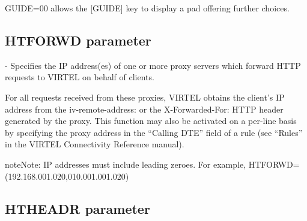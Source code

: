 \documentclass[letterpaper,10pt,english]{sphinxmanual}
\begin{document}
GUIDE=00 allows the {[}GUIDE{]} key to display a pad offering further choices.

\ignorespaces 

\subsection{HTFORWD parameter}
\label{\detokenize{Installation_Guide:htforwd-parameter}}\label{\detokenize{Installation_Guide:index-76}}
\begin{sphinxVerbatim}[commandchars=\\\{\}]
        
\end{sphinxVerbatim}

 - Specifies the IP address(es) of one or more proxy servers which forward HTTP requests to VIRTEL on behalf of clients.

For all requests received from these proxies, VIRTEL obtains the client’s IP address from the iv-remote-address: or the X-Forwarded-For: HTTP header generated by the proxy. This function may also be activated on a per-line basis by specifying the proxy address in the “Calling DTE” field of a rule (see “Rules” in the VIRTEL Connectivity Reference manual).

\begin{sphinxadmonition}{note}{Note:}
IP addresses must include leading zeroes. For example, HTFORWD=(192.168.001.020,010.001.001.020)
\end{sphinxadmonition}

\ignorespaces 

\subsection{HTHEADR parameter}
\label{\detokenize{Installation_Guide:htheadr-parameter}}\label{\detokenize{Installation_Guide:index-77}}
\begin{sphinxVerbatim}[commandchars=\\\{\}]
                
\end{sphinxVerbatim}
\end{document}
